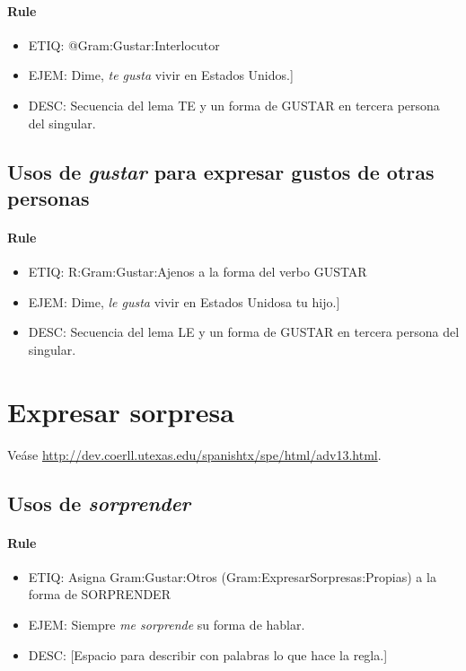 \documentclass[11pt]{report}
\begin{document}
\paragraph*{Rule}
\begin{itemize}
\item ETIQ: @Gram:Gustar:Interlocutor
\item EJEM: Dime, \emph{te gusta} vivir en Estados Unidos.] 
\item DESC: Secuencia del lema TE y un forma de GUSTAR en tercera persona del singular.
\end{itemize}

\subsection{Usos de \emph{gustar} para expresar gustos de otras personas}
\paragraph*{Rule}
\begin{itemize}
\item ETIQ: R:Gram:Gustar:Ajenos a la forma del verbo GUSTAR
\item EJEM: Dime, \emph{le gusta} vivir en Estados Unidosa tu hijo.] 
\item DESC: Secuencia del lema LE y un forma de GUSTAR en tercera persona del singular.
\end{itemize}

\section{Expresar sorpresa}
Veáse \url{http://dev.coerll.utexas.edu/spanishtx/spe/html/adv13.html}.

\subsection{Usos de \emph{sorprender}}
\paragraph*{Rule}
\begin{itemize}
\item ETIQ: Asigna Gram:Gustar:Otros (Gram:ExpresarSorpresas:Propias) a la forma de SORPRENDER
\item EJEM: Siempre \emph{me sorprende} su forma de hablar.
\item DESC: [Espacio para describir con palabras lo que hace la regla.]
\end{itemize}
\end{document}
